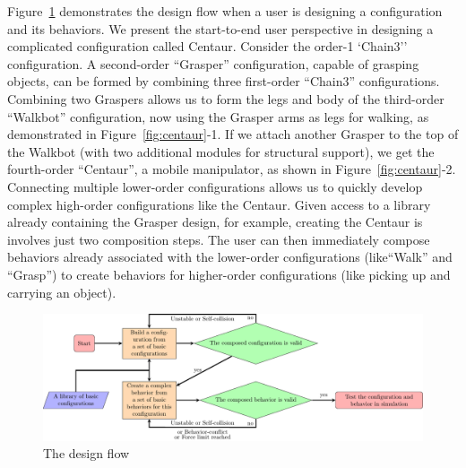 \documentclass[graybox]{svmult}
\begin{document}
Figure~\ref{fig:design} demonstrates the design flow when a user is designing a configuration and its behaviors. We present the start-to-end user perspective in designing a complicated configuration called Centaur. Consider the
order-1 `Chain3'' configuration. A second-order ``Grasper'' configuration, capable of grasping
objects, can be formed by combining three first-order ``Chain3'' configurations.   Combining two Graspers allows
us to form the legs and body of the third-order ``Walkbot'' configuration, now using the
Grasper arms as legs for walking, as demonstrated in Figure~\ref{fig:centaur}-1. If
we attach
another Grasper to the top of the Walkbot (with two additional modules for structural
support), we get the fourth-order ``Centaur'', a mobile manipulator, as shown in Figure~\ref{fig:centaur}-2. Connecting
multiple lower-order configurations allows us to quickly develop complex high-order
configurations like the Centaur. Given access to a library already containing
the Grasper design, for example, creating the Centaur is involves just two composition
steps.  The user can then immediately
compose behaviors already associated with the lower-order configurations (like``Walk'' and
``Grasp'') to create behaviors for higher-order configurations (like picking
up and carrying an object). \begin{figure}
\begin{center}
\includegraphics[width=\columnwidth]{images/tikz/design_diagram_hori.pdf}
\caption{The design flow}
\label{fig:design}
\end{center}
\end{figure}

\end{document}
